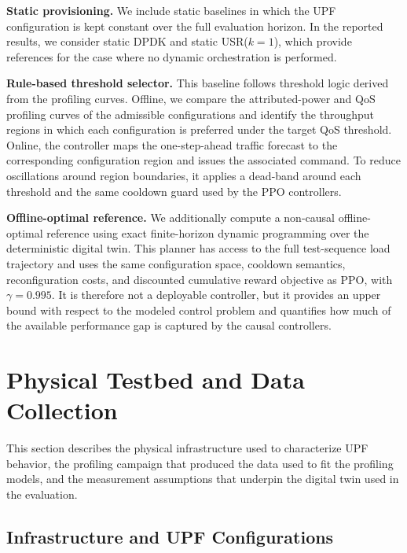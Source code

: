 \documentclass[a4paper,fleqn]{cas-sc}
\begin{document}
\textbf{Static provisioning.} We include static baselines in which the UPF configuration is kept constant over the full evaluation horizon. In the reported results, we consider static DPDK and static USR($k=1$), which provide references for the case where no dynamic orchestration is performed.

\textbf{Rule-based threshold selector.} This baseline follows threshold logic derived from the profiling curves. Offline, we compare the attributed-power and QoS profiling curves of the admissible configurations and identify the throughput regions in which each configuration is preferred under the target QoS threshold. Online, the controller maps the one-step-ahead traffic forecast to the corresponding configuration region and issues the associated command. To reduce oscillations around region boundaries, it applies a dead-band around each threshold and the same cooldown guard used by the PPO controllers.

\textbf{Offline-optimal reference.} We additionally compute a non-causal offline-optimal reference using exact finite-horizon dynamic programming over the deterministic digital twin. This planner has access to the full test-sequence load trajectory and uses the same configuration space, cooldown semantics, reconfiguration costs, and discounted cumulative reward objective as PPO, with $\gamma=0.995$. It is therefore not a deployable controller, but it provides an upper bound with respect to the modeled control problem and quantifies how much of the available performance gap is captured by the causal controllers.


\section{Physical Testbed and Data Collection}

\label{testbed_hw}

This section describes the physical infrastructure used to characterize UPF behavior, the profiling campaign that produced the data used to fit the profiling models, and the measurement assumptions that underpin the digital twin used in the evaluation.

\subsection{Infrastructure and UPF Configurations}
\label{subsec:hw_infra}
\end{document}

